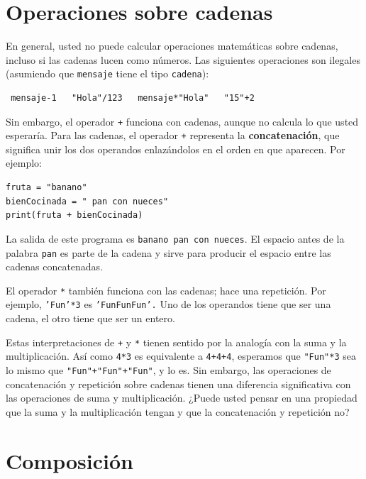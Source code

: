 \section{Operaciones sobre cadenas}


En general, usted no puede calcular operaciones matemáticas sobre
cadenas, incluso si las cadenas lucen como números. Las siguientes
operaciones son ilegales (asumiendo que \texttt{mensaje} tiene el
tipo \texttt{cadena}):

\begin{verbatim}
 mensaje-1   "Hola"/123   mensaje*"Hola"   "15"+2
\end{verbatim}

Sin embargo, el operador \texttt{+} funciona con cadenas, aunque no
calcula lo que usted esperaría. Para las cadenas, el operador \texttt{+}
representa la \textbf{concatenación}, que significa unir los dos operandos
enlazándolos en el orden en que aparecen. Por ejemplo:


\begin{verbatim}
fruta = "banano"
bienCocinada = " pan con nueces"
print(fruta + bienCocinada)
\end{verbatim}

La salida de este programa es \texttt{banano pan con nueces}. El espacio
antes de la palabra \texttt{pan} es parte de la cadena y sirve para
producir el espacio entre las cadenas concatenadas.

El operador \texttt{{*}} también funciona con las cadenas; hace una
repetición. Por ejemplo, \texttt{'Fun'{*}3} es \texttt{'FunFunFun'.}
Uno de los operandos tiene que ser una cadena, el otro tiene que ser
un entero.

Estas interpretaciones de \texttt{+} y \texttt{{*}} tienen sentido
por la analogía con la suma y la multiplicación. Así como \texttt{4{*}3}
es equivalente a \texttt{4+4+4}, esperamos que \verb+"Fun"*3+ sea
lo mismo que {\verb/"Fun"+"Fun"+"Fun"/}, y lo es. Sin embargo,
las operaciones de concatenación y repetición sobre cadenas tienen
una diferencia significativa con las operaciones de suma y multiplicación.
¿Puede usted pensar en una propiedad que la suma y la multiplicación
tengan y que la concatenación y repetición no?

\section{Composición}

